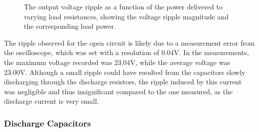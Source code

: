 \begin{figure}[H]
\begin{minipage}{0.48\textwidth}
{%
        }
        \captionsetup{justification=raggedright, labelfont=bf}
        \caption{The output voltage ripple as a function of the power delivered to varying load resistances, showing the voltage ripple magnitude and the corresponding load power.}
        \label{fig:OutputVoltageRipplePower}
    \end{minipage}
\end{figure}
The ripple observed for the open circuit is likely due to a measurement error from the oscilloscope, which was set with a resolution of 0.04V. In the measurements, the maximum voltage recorded was 23.04V, while the average voltage was 23.00V. Although a small ripple could have resulted from the capacitors slowly discharging through the discharge resistors, the ripple induced by this current was negligible and thus insignificant compared to the one measured, as the discharge current is very small.
\subsubsection{Discharge Capacitors}


